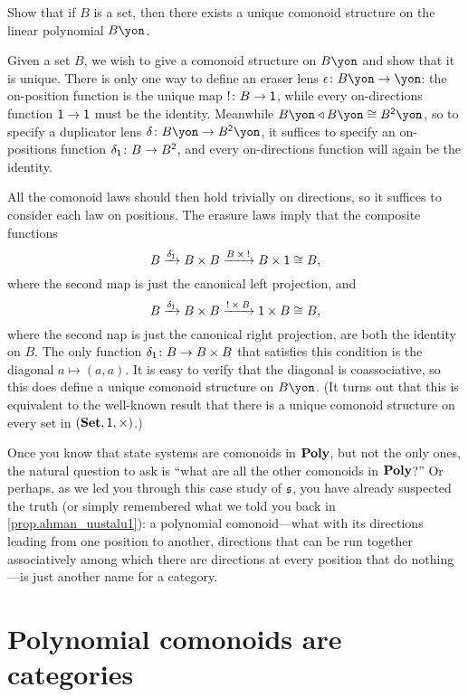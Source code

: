 \documentclass[Book-Poly]{subfiles}
\begin{document}
\begin{exercise}\label{exc.linear_poly_comon}
Show that if $B$ is a set, then there exists a unique comonoid structure on the linear polynomial $B\yon$.
\begin{solution}
Given a set $B$, we wish to give a comonoid structure on $B\yon$ and show that it is unique.
There is only one way to define an eraser lens $\epsilon\colon B\yon\to\yon$: the on-position function is the unique map $!\colon B\to\textsf{1}$, while every on-directions function $\textsf{1}\to\textsf{1}$ must be the identity.
Meanwhile $B\yon\tri B\yon\iso B^\2\yon$, so to specify a duplicator lens $\delta\colon B\yon\to B^\2\yon$, it suffices to specify an on-positions function $\delta_{\textsf{1}}\colon B\to B^{\textsf{2}}$, and every on-directions function will again be the identity.

All the comonoid laws should then hold trivially on directions, so it suffices to consider each law on positions.
The erasure laws imply that the composite functions
\[
    B\xrightarrow{\delta_{\textsf{1}}}B\times B\xrightarrow{B\:\times\:!}B\times\textsf{1}\cong B,
\]
where the second map is just the canonical left projection, and
\[
    B\xrightarrow{\delta_{\textsf{1}}}B\times B\xrightarrow{!\:\times\:B}\textsf{1}\times B\cong B,
\]
where the second nap is just the canonical right projection, are both the identity on $B$.
The only function $\delta_{\textsf{1}}\colon B\to B\times B$ that satisfies this condition is the diagonal $a\mapsto(a,a)$.
It is easy to verify that the diagonal is coassociative, so this does define a unique comonoid structure on $B\yon$.
(It turns out that this is equivalent to the well-known result that there is a unique comonoid structure on every set in $(\mathbf{Set},\textsf{1},\times)$.)
\end{solution}
\end{exercise}

Once you know that state systems are comonoids in $\mathbf{Poly}$, but not the only ones, the natural question to ask is ``what are all the other comonoids in $\mathbf{Poly}$?''
Or perhaps, as we led you through this case study of $\mathfrak{s}$, you have already suspected the truth (or simply remembered what we told you back in \cref{prop.ahman_uustalu1}): a polynomial comonoid---what with its directions leading from one position to another, directions that can be run together associatively among which there are directions at every position that do nothing---is just another name for a category.

\section{Polynomial comonoids are categories}
\end{document}
